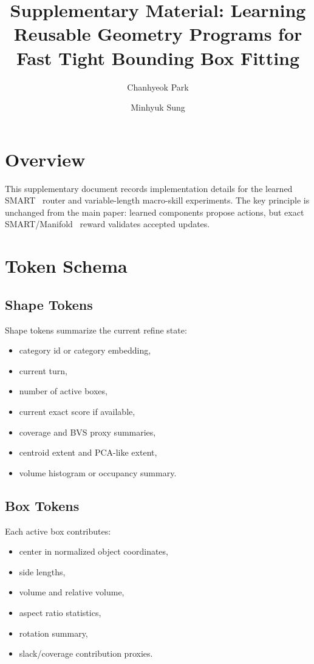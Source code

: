 \documentclass[10pt,twocolumn,letterpaper]{article}
\title{Supplementary Material: Learning Reusable Geometry Programs for Fast Tight Bounding Box Fitting}
\author{Chanhyeok Park \and Minhyuk Sung}
\begin{document}
\maketitle

\section{Overview}

This supplementary document records implementation details for the learned
SMART~\cite{park2024smart} router and variable-length macro-skill experiments.
The key principle is unchanged from the main paper: learned components propose
actions, but exact SMART/Manifold~\cite{huang2020manifoldplus} reward validates
accepted updates.

\section{Token Schema}

\subsection{Shape Tokens}

Shape tokens summarize the current refine state:

\begin{itemize}
\item category id or category embedding,
\item current turn,
\item number of active boxes,
\item current exact score if available,
\item coverage and BVS proxy summaries,
\item centroid extent and PCA-like extent,
\item volume histogram or occupancy summary.
\end{itemize}

\subsection{Box Tokens}

Each active box contributes:

\begin{itemize}
\item center in normalized object coordinates,
\item side lengths,
\item volume and relative volume,
\item aspect ratio statistics,
\item rotation summary,
\item slack/coverage contribution proxies.
\end{itemize}
\end{document}
